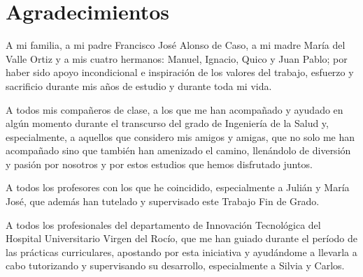 \chapter*{Agradecimientos}

A mi familia, a mi padre Francisco José Alonso de Caso, a mi madre María del Valle Ortiz y a mis cuatro hermanos: Manuel, Ignacio, Quico y Juan Pablo; por haber sido apoyo incondicional e inspiración de los valores del trabajo, esfuerzo y sacrificio durante mis años de estudio y durante toda mi vida.

A todos mis compañeros de clase, a los que me han acompañado y ayudado en algún momento durante el transcurso del grado de Ingeniería de la Salud y, especialmente, a aquellos que considero mis amigos y amigas, que no solo me han acompañado sino que también han amenizado el camino, llenándolo de diversión y pasión por nosotros y por estos estudios que hemos disfrutado juntos.

A todos los profesores con los que he coincidido, especialmente a Julián y María José, que además han tutelado y supervisado este Trabajo Fin de Grado.

A todos los profesionales del departamento de Innovación Tecnológica del Hospital Universitario Virgen del Rocío, que me han guiado durante el período de las prácticas curriculares, apostando por esta iniciativa y ayudándome a llevarla a cabo tutorizando y supervisando su desarrollo, especialmente a Silvia y Carlos.

